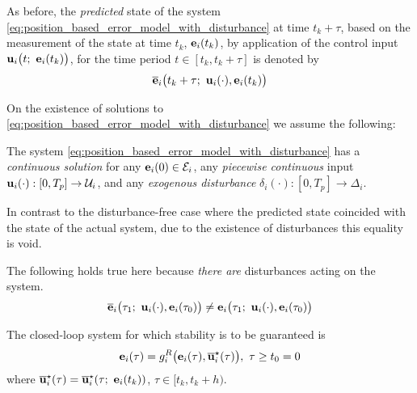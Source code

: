 As before, the \textit{predicted} state of the system
\eqref{eq:position_based_error_model_with_disturbance}
at time $t_k + \tau$, based on the measurement of the state at time
$t_k$, $\bm{\mathbf{e}}_i(t_k)$, by application of the control input
$\vect{u}_i\big(t;\ \vect{e}_i(t_k)\big)$, for the time period $t \in [t_k, t_k + \tau]$
is denoted by
\begin{align}
  \overline{\bm{\mathbf{e}}}_i\big(t_k + \tau;\ \bm{\mathbf{u}}_i(\cdot), \bm{\mathbf{e}}_i(t_k)\big) \label{eq:position_based_predicted_error_0_2}
\end{align}

On the existence of solutions to
\eqref{eq:position_based_error_model_with_disturbance} we assume the following:
\begin{bw_box}
\begin{assumption}
  The system \eqref{eq:position_based_error_model_with_disturbance} has a
  \textit{continuous solution} for any $\bm{\mathbf{e}}_i(0) \in \mathcal{E}_i$,
  any \textit{piecewise continuous} input
  $\bm{\mathbf{u}}_i(\cdot) :[0,T_p] \to \mathcal{U}_i$, and any
  \textit{exogenous disturbance} $\delta_i(\cdot) : [0,T_p] \to \Delta_i$.

  \label{ass:existence_of_solutions_with_disturbance}
\end{assumption}
\end{bw_box}


In contrast to the disturbance-free case where the predicted state coincided
with the state of the actual system, due to the existence of disturbances
this equality is void.

\begin{bw_box}
\begin{remark}
  The following holds true here because \textit{there are} disturbances
  acting on the system.
  \begin{align}
    \overline{\bm{\mathbf{e}}}_i\big(\tau_1;\ \bm{\mathbf{u}}_i(\cdot), \bm{\mathbf{e}}_i(\tau_0)\big) \not=
    \bm{\mathbf{e}}_i\big(\tau_1;\ \bm{\mathbf{u}}_i(\cdot), \bm{\mathbf{e}}_i(\tau_0)\big)
    \label{eq:error_now_to_predicted_error_2}
  \end{align}
\end{remark}
\end{bw_box}

The closed-loop system for which stability is to be guaranteed is
\begin{align}
  \bm{\mathbf{e}}_i(\tau) = g_i^R\big(\bm{\mathbf{e}}_i(\tau), \overline{\bm{\mathbf{u}}}_i^{\star}(\tau)\big),\ \tau \geq t_0 = 0
  \label{eq:with_disturbances_closed_loop}
\end{align}
where $\overline{\bm{\mathbf{u}}}_i^{\star}(\tau) = \overline{\bm{\mathbf{u}}}_i^{\star}(\tau;\ \bm{\mathbf{e}}_i(t_k))$,
$\tau \in [t_k, t_k + h)$.

